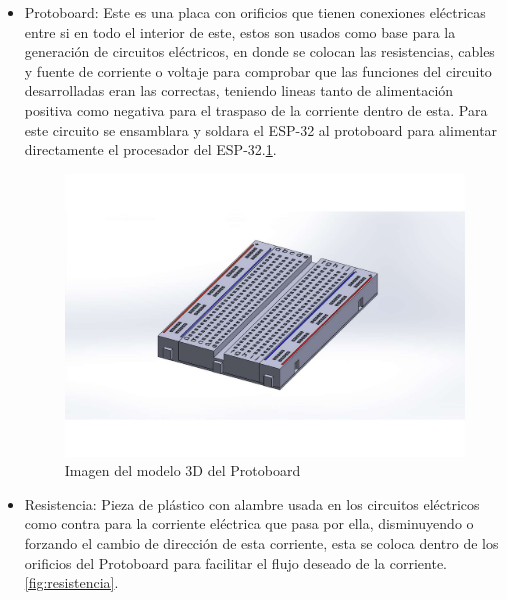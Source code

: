     
        \begin{itemize}
            \item Protoboard: Este es una placa con orificios que tienen conexiones eléctricas entre si en todo el interior de este, estos son usados como base para la generación de circuitos eléctricos, en donde se colocan las resistencias, cables y fuente de corriente o voltaje para comprobar que las funciones del circuito desarrolladas eran las correctas, teniendo lineas tanto de alimentación positiva como negativa para el traspaso de la corriente dentro de esta. Para este circuito se ensamblara y soldara  el ESP-32 al protoboard para alimentar directamente el procesador del ESP-32.\ref{fig:protoboard}.
    
            \begin{figure}[H]
        \centering
        \includegraphics[trim = {65mm 40mm 65mm 40mm},clip,scale=0.5]{19/Img/protoboardFigura.pdf}
        \caption{Imagen del modelo 3D del Protoboard}
        \label{fig:protoboard}
    \end{figure}
    
    \item Resistencia: Pieza de plástico con alambre usada en los circuitos eléctricos como contra para la corriente eléctrica que pasa por ella, disminuyendo o forzando el cambio de dirección de esta corriente, esta se coloca dentro de los orificios del Protoboard para facilitar el flujo deseado de la corriente.\ref{fig:resistencia}.
    

\end{itemize}
